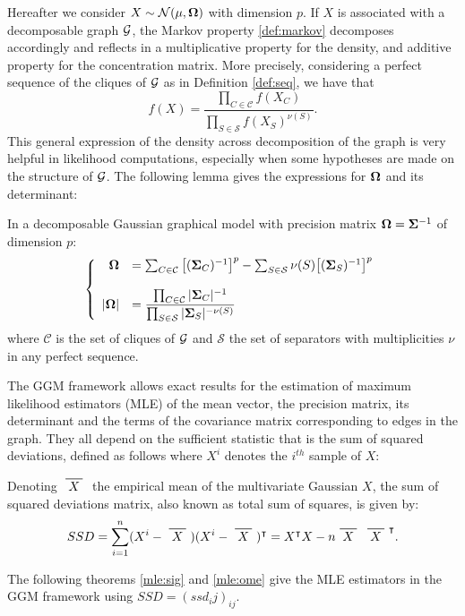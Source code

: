 Hereafter we consider  $X\sim\mathcal{N} (\mu, {\boldsymbol{\Omega}})$ with dimension $p$. If $X$ is associated with a decomposable graph $\mathcal{G}$, the Markov property \ref{def:markov} decomposes accordingly and reflects in a multiplicative property for the density, and additive property for the concentration matrix. More precisely, considering a perfect sequence of the cliques of $\mathcal{G}$ as in Definition \ref{def:seq}, we have that
 $$f(X)=\dfrac{\prod_{C\in \mathcal{C}} f(X_C)}{\prod_{S\in \mathcal{S}} f(X_S)^{\nu(S)}}.$$
This general expression of the density across decomposition of the graph is very helpful in likelihood computations, especially when some hypotheses are made on the structure of $\mathcal{G}$. The following lemma gives the expressions for ${\boldsymbol{\Omega}}$ and its determinant:
 \begin{lemma} In a decomposable Gaussian graphical model with precision matrix ${\boldsymbol{\Omega}} = {\boldsymbol{\Sigma}}^{-1}$ of dimension $p$:
 \begin{equation*}
 \left\{
 \begin{array}{rl}
 {\boldsymbol{\Omega}} &= \sum_{C\in \mathcal{C}} \big[({\boldsymbol{\Sigma}}_C)^{-1}\big]^p - \sum_{S\in \mathcal{S}} \nu(S)  \big[({\boldsymbol{\Sigma}}_S)^{-1}\big]^p \\\\
 |{\boldsymbol{\Omega}}| &=\dfrac{\prod_{C\in \mathcal{C}} |{\boldsymbol{\Sigma}}_C|^{-1}}{\prod_{S\in \mathcal{S}} |{\boldsymbol{\Sigma}}_S|^{-\nu(S)}}
 \end{array} \right.
\end{equation*}  
where $\mathcal{C}$ is the set of cliques of $\mathcal{G}$ and $\mathcal{S}$ the set of separators with multiplicities $\nu$ in any perfect sequence. 
\end{lemma}

The GGM framework allows exact results for the estimation of maximum likelihood estimators (MLE) of the mean vector, the precision matrix, its determinant and the terms of the covariance matrix corresponding to edges in the graph. They all depend on the sufficient statistic that is the sum of squared deviations, defined as follows where $X^i$ denotes the $i^{th}$ sample of $X$:
\begin{definition}
Denoting $\xbar{X}$ the empirical mean of the multivariate Gaussian $X$, the sum of squared deviations matrix, also known as total sum of squares,  is given by:
$$SSD = \sum_{i=1}^n (X^i - \xbar{X})(X^i - \xbar{X})^\intercal = X^\intercal X - n  \xbar{X} \,\xbar{X}^\intercal.$$
\end{definition}
The following theorems \ref{mle:sig} and \ref{mle:ome} give the MLE estimators in the GGM framework using $SSD=(ssd_ij)_{ij}$.
 
